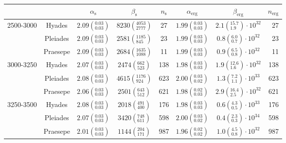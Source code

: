 \begin{tabular}{lccccccr}
\hline
          &         &                $\alpha_\mathrm{s}$ &                 $\beta_\mathrm{s}$ & $n_\mathrm{s}$ &              $\alpha_\mathrm{erg}$ &                          $\beta_\mathrm{erg}$ & $n_\mathrm{erg}$ \\
\hline
2500-3000 & Hyades &  $2.09\left(^{0.03}_{0.03}\right)$ &  $8230\left(^{4053}_{2777}\right)$ &             27 &  $1.99\left(^{0.03}_{0.03}\right)$ &  $2.1\left(^{15.7}_{1.9}\right)\cdot 10^{32}$ &               27 \\
          & Pleiades &  $2.09\left(^{0.03}_{0.03}\right)$ &   $2581\left(^{1185}_{845}\right)$ &             23 &  $1.99\left(^{0.03}_{0.03}\right)$ &   $0.8\left(^{6.0}_{0.7}\right)\cdot 10^{32}$ &               23 \\
          & Praesepe &  $2.09\left(^{0.03}_{0.03}\right)$ &  $2684\left(^{1635}_{1088}\right)$ &             11 &  $1.99\left(^{0.03}_{0.03}\right)$ &   $0.9\left(^{6.5}_{0.8}\right)\cdot 10^{32}$ &               11 \\
3000-3250 & Hyades &  $2.07\left(^{0.03}_{0.03}\right)$ &    $2474\left(^{662}_{523}\right)$ &            138 &  $1.98\left(^{0.03}_{0.03}\right)$ &  $1.9\left(^{12.6}_{1.6}\right)\cdot 10^{32}$ &              138 \\
          & Pleiades &  $2.08\left(^{0.03}_{0.03}\right)$ &   $4615\left(^{1176}_{924}\right)$ &            623 &  $2.00\left(^{0.03}_{0.02}\right)$ &   $1.3\left(^{7.2}_{1.1}\right)\cdot 10^{33}$ &              623 \\
          & Praesepe &  $2.06\left(^{0.03}_{0.03}\right)$ &    $2501\left(^{643}_{512}\right)$ &            621 &  $1.98\left(^{0.02}_{0.03}\right)$ &  $2.9\left(^{16.4}_{2.5}\right)\cdot 10^{32}$ &              621 \\
3250-3500 & Hyades &  $2.08\left(^{0.03}_{0.03}\right)$ &    $2018\left(^{491}_{400}\right)$ &            176 &  $1.98\left(^{0.03}_{0.03}\right)$ &   $0.6\left(^{4.3}_{0.5}\right)\cdot 10^{33}$ &              176 \\
          & Pleiades &  $2.07\left(^{0.03}_{0.03}\right)$ &    $3420\left(^{748}_{611}\right)$ &            598 &  $2.00\left(^{0.03}_{0.02}\right)$ &   $0.4\left(^{2.3}_{0.3}\right)\cdot 10^{34}$ &              598 \\
          & Praesepe &  $2.01\left(^{0.03}_{0.03}\right)$ &    $1144\left(^{204}_{171}\right)$ &            987 &  $1.96\left(^{0.02}_{0.02}\right)$ &   $1.0\left(^{4.5}_{0.8}\right)\cdot 10^{32}$ &              987 \\

\end{tabular}
